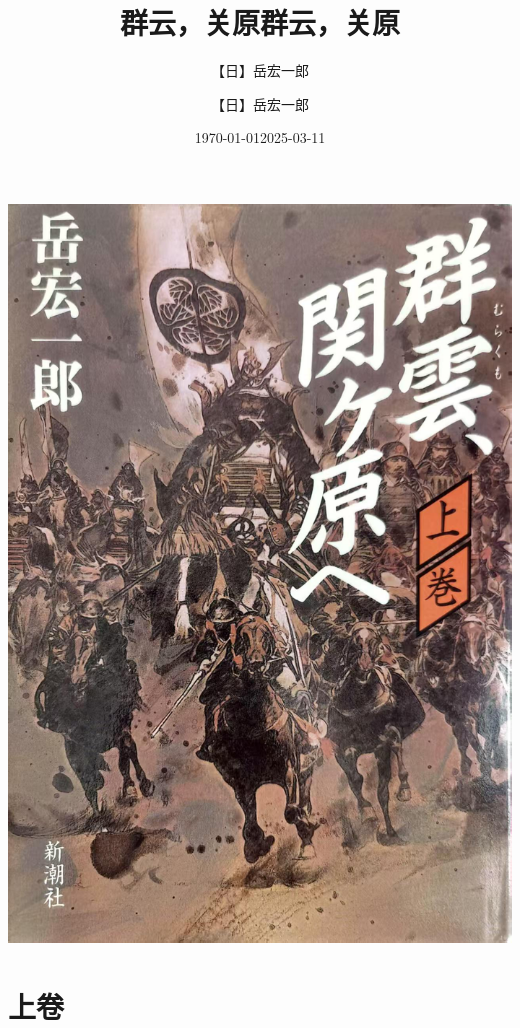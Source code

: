 \documentclass[
]{book}
\title{群云，关原}
\author{【日】岳宏一郎}
\date{\today}
\title{群云，关原}
\author{【日】岳宏一郎}
\date{2025-03-11}
\begin{document}
\maketitle

{
\setcounter{tocdepth}{1}
\tableofcontents
}
\chapter*{}\label{section}

\includegraphics[width=1\textwidth,height=\textheight]{image/cover.jpg}

\part*{上卷}\label{part-ux4e0aux5377}
\end{document}
